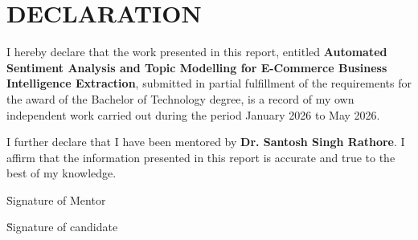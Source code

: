 
\newpage
\section*{DECLARATION}

I hereby declare that the work presented in this report, entitled \textbf{Automated Sentiment Analysis and Topic Modelling for E-Commerce Business Intelligence Extraction}, submitted in partial fulfillment of the requirements for the award of the Bachelor of Technology degree, is a record of my own independent work carried out during the period January 2026 to May 2026.

I further declare that I have been mentored by \textbf{Dr. Santosh Singh Rathore}. I affirm that the information presented in this report is accurate and true to the best of my knowledge.

\vspace{2cm}

\begin{minipage}[t]{0.45\textwidth}
\begin{tabbing}
 \= Signature of Mentor \\
\end{tabbing}
\end{minipage} \hfill
\begin{minipage}[t]{0.45\textwidth}
\begin{tabbing}
\= Signature of candidate \\
\end{tabbing}
\end{minipage}



